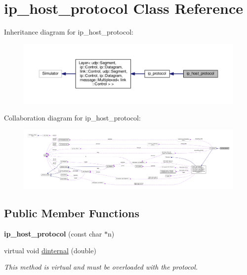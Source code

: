 \hypertarget{classip__host__protocol}{}\section{ip\+\_\+host\+\_\+protocol Class Reference}
\label{classip__host__protocol}


Inheritance diagram for ip\+\_\+host\+\_\+protocol\+:\nopagebreak
\begin{figure}[H]
\begin{center}
\leavevmode
\includegraphics[width=350pt]{classip__host__protocol__inherit__graph}
\end{center}
\end{figure}


Collaboration diagram for ip\+\_\+host\+\_\+protocol\+:\nopagebreak
\begin{figure}[H]
\begin{center}
\leavevmode
\includegraphics[width=350pt]{classip__host__protocol__coll__graph}
\end{center}
\end{figure}
\subsection*{Public Member Functions}
\begin{DoxyCompactItemize}
\item 
{\bfseries ip\+\_\+host\+\_\+protocol} (const char $\ast$n)\hypertarget{classip__host__protocol_a29412893a5845c69af6031eb6734e8c0}{}\label{classip__host__protocol_a29412893a5845c69af6031eb6734e8c0}

\item 
virtual void \hyperlink{classip__host__protocol_a2e2c43aeb81ae38702b7dec6f7df9227}{dinternal} (double)
\begin{DoxyCompactList}\small\item\em This method is virtual and must be overloaded with the protocol. \end{DoxyCompactList}\end{DoxyCompactItemize}
